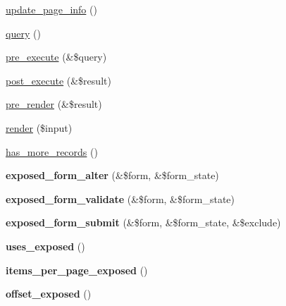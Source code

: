 \begin{DoxyCompactItemize}
\hyperlink{classviews__plugin__pager_ab4ecbd01ed64c4a6c0079410d8b4dddc}{update\_\-page\_\-info} ()
\item 
\hyperlink{classviews__plugin__pager_a6b9aad7e28125013cbf7a15c19e78d47}{query} ()
\item 
\hyperlink{classviews__plugin__pager_a45d3511ab5324a0432cea29f8b4641de}{pre\_\-execute} (\&\$query)
\item 
\hyperlink{classviews__plugin__pager_a59687607f417ac6b3787ddb0ce71757c}{post\_\-execute} (\&\$result)
\item 
\hyperlink{classviews__plugin__pager_a0601e340779ba6846e6fb54cd1d2cd62}{pre\_\-render} (\&\$result)
\item 
\hyperlink{classviews__plugin__pager_abfc50728fdc63bfe94bcd242d39deb1e}{render} (\$input)
\item 
\hyperlink{classviews__plugin__pager_a8ab216a6bec20ad24a9645bb28f10cce}{has\_\-more\_\-records} ()
\item 
\hypertarget{classviews__plugin__pager_a8eddf7fccddda6d86ff958d4ce192d77}{
{\bfseries exposed\_\-form\_\-alter} (\&\$form, \&\$form\_\-state)}
\label{classviews__plugin__pager_a8eddf7fccddda6d86ff958d4ce192d77}

\item 
\hypertarget{classviews__plugin__pager_af4d3d05215185cae4ff7ccdf65942cb8}{
{\bfseries exposed\_\-form\_\-validate} (\&\$form, \&\$form\_\-state)}
\label{classviews__plugin__pager_af4d3d05215185cae4ff7ccdf65942cb8}

\item 
\hypertarget{classviews__plugin__pager_a64d2f06939269a1dbae3458103666d38}{
{\bfseries exposed\_\-form\_\-submit} (\&\$form, \&\$form\_\-state, \&\$exclude)}
\label{classviews__plugin__pager_a64d2f06939269a1dbae3458103666d38}

\item 
\hypertarget{classviews__plugin__pager_acf8a9957bcb01a246eeebdb086d1168c}{
{\bfseries uses\_\-exposed} ()}
\label{classviews__plugin__pager_acf8a9957bcb01a246eeebdb086d1168c}

\item 
\hypertarget{classviews__plugin__pager_a5133617c789eec960c2e9e007b9b53cb}{
{\bfseries items\_\-per\_\-page\_\-exposed} ()}
\label{classviews__plugin__pager_a5133617c789eec960c2e9e007b9b53cb}

\item 
\hypertarget{classviews__plugin__pager_add01e4ce1b77b34b280e69b876b61b09}{
{\bfseries offset\_\-exposed} ()}
\label{classviews__plugin__pager_add01e4ce1b77b34b280e69b876b61b09}

\end{DoxyCompactItemize}
